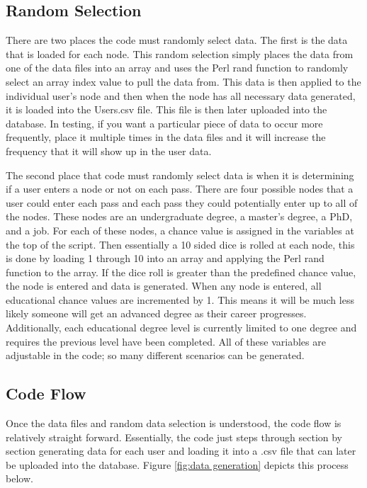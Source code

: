 \subsection{Random Selection}
There are two places the code must randomly select data.  The first is the
data that is loaded for each node.  This random selection simply places the data
from one of the data files into an array and uses the Perl rand function to
randomly select an array index value to pull the data from.  This data is then
applied to the individual user's node and then when the node has all necessary
data generated, it is loaded into the Users.csv file.  This file is then later
uploaded into the database.  In testing, if you want a particular piece of data
to occur more frequently, place it multiple times in the data files and it
will increase the frequency that it will show up in the user data.

The second place that code must randomly select data is when it is determining
if a user enters a node or not on each pass.  There are four possible nodes that
a user could enter each pass and each pass they could potentially enter up to
all of the nodes.  These nodes are an undergraduate degree, a master's degree, a
PhD, and a job.  For each of these nodes, a chance value is assigned in the
variables at the top of the script.  Then essentially a 10 sided dice is rolled
at each node, this is done by loading 1 through 10 into an array and applying
the Perl rand function to the array.  If the dice roll is greater than the
predefined chance value, the node is entered and data is generated.  When any
node is entered, all educational chance values are incremented by 1.  This means
it will be much less likely someone will get an advanced degree as their career
progresses.  Additionally, each educational degree level is currently limited to
one degree and requires the previous level have been completed.  All of these
variables are adjustable in the code; so many different scenarios can be
generated.


\subsection{Code Flow}
Once the data files and random data selection is understood, the code flow is
relatively straight forward.  Essentially, the code just steps through section
by section generating data for each user and loading it into a .csv file that
can later be uploaded into the database.  Figure \ref {fig:data generation}
depicts this process below.

